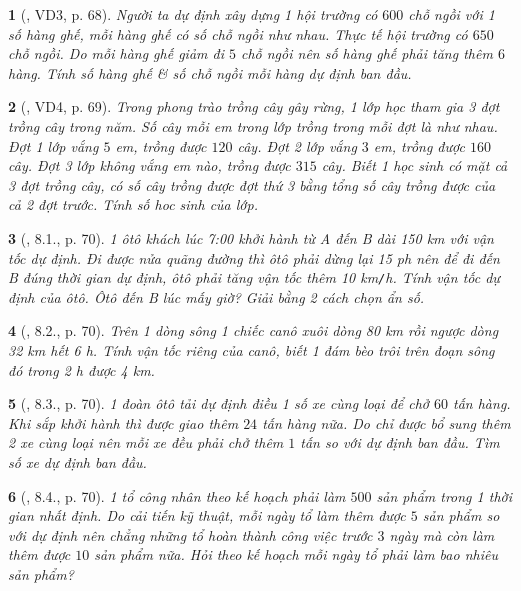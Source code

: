 \documentclass{article}
\newtheorem{baitoan}{}
\begin{document}
\begin{baitoan}[\cite{Binh_boi_duong_Toan_9_tap_2}, VD3, p. 68]
	Người ta dự định xây dựng 1 hội trường có $600$ chỗ ngồi với 1 số hàng ghế, mỗi hàng ghế có số chỗ ngồi như nhau. Thực tế hội trường có $650$ chỗ ngồi. Do mỗi hàng ghế giảm đi $5$ chỗ ngồi nên số hàng ghế phải tăng thêm $6$ hàng. Tính số hàng ghế \& số chỗ ngồi mỗi hàng dự định ban đầu.
\end{baitoan}

\begin{baitoan}[\cite{Binh_boi_duong_Toan_9_tap_2}, VD4, p. 69]
	Trong phong trào trồng cây gây rừng, 1 lớp học tham gia 3 đợt trồng cây trong năm. Số cây mỗi em trong lớp trồng trong mỗi đợt là như nhau. Đợt 1 lớp vắng $5$ em, trồng được $120$ cây. Đợt 2 lớp vắng $3$ em, trồng được $160$ cây. Đợt 3 lớp không vắng em nào, trồng được $315$ cây. Biết 1 học sinh có mặt cả 3 đợt trồng cây, có số cây trồng được đợt thứ 3 bằng tổng số cây trồng được của cả 2 đợt trước. Tính số hoc sinh của lớp.
\end{baitoan}

\begin{baitoan}[\cite{Binh_boi_duong_Toan_9_tap_2}, 8.1., p. 70]
	1 ôtô khách lúc {\rm7:00} khởi hành từ A đến B dài {\rm150 km} với vận tốc dự định. Đi được nửa quãng đường thì ôtô phải dừng lại {\rm15 ph} nên để đi đến B đúng thời gian dự định, ôtô phải tăng vận tốc thêm {\rm10 km{\tt/}h}. Tính vận tốc dự định của ôtô. Ôtô đến B lúc mấy giờ? Giải bằng 2 cách chọn ẩn số.
\end{baitoan}

\begin{baitoan}[\cite{Binh_boi_duong_Toan_9_tap_2}, 8.2., p. 70]
	Trên 1 dòng sông 1 chiếc canô xuôi dòng {\rm80 km} rồi ngược dòng {\rm32 km} hết {\rm6 h}. Tính vận tốc riêng của canô, biết 1 đám bèo trôi trên đoạn sông đó trong {\rm2 h} được {\rm4 km}.
\end{baitoan}

\begin{baitoan}[\cite{Binh_boi_duong_Toan_9_tap_2}, 8.3., p. 70]
	1 đoàn ôtô tải dự định điều 1 số xe cùng loại để chở $60$ tấn hàng. Khi sắp khởi hành thì được giao thêm $24$ tấn hàng nữa. Do chỉ được bổ sung thêm 2 xe cùng loại nên mỗi xe đều phải chở thêm $1$ tấn so với dự định ban đầu. Tìm số xe dự định ban đầu.
\end{baitoan}

\begin{baitoan}[\cite{Binh_boi_duong_Toan_9_tap_2}, 8.4., p. 70]
	1 tổ công nhân theo kế hoạch phải làm $500$ sản phẩm trong 1 thời gian nhất định. Do cải tiến kỹ thuật, mỗi ngày tổ làm thêm được $5$ sản phẩm so với dự định nên chẳng những tổ hoàn thành công việc trước $3$ ngày mà còn làm thêm được $10$ sản phẩm nữa. Hỏi theo kế hoạch mỗi ngày tổ phải làm bao nhiêu sản phẩm?
\end{baitoan}
\end{document}
